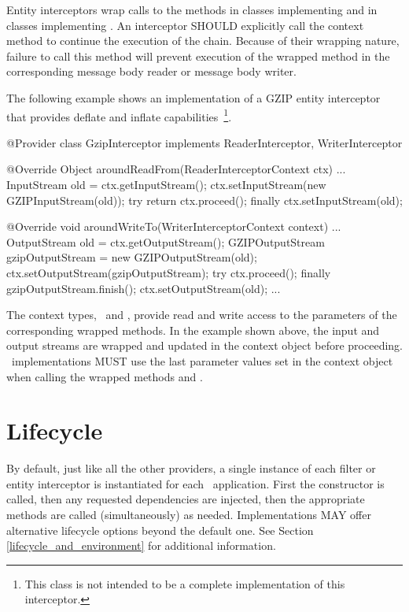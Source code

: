 Entity interceptors wrap calls to the methods  in classes implementing  and  in classes implementing . An interceptor SHOULD explicitly call the context method  to continue the execution of the chain. Because of their wrapping nature, failure to call this method will prevent execution of the wrapped method in the corresponding message body reader or message body writer.

The following example shows an implementation of a GZIP entity interceptor that provides deflate and inflate capabilities~\footnote{This class is not intended to be a complete implementation of this interceptor.}.

\begin{listing}{1}
@Provider
class GzipInterceptor implements ReaderInterceptor, WriterInterceptor {

    @Override
    Object aroundReadFrom(ReaderInterceptorContext ctx) ... {
        InputStream old = ctx.getInputStream();
        ctx.setInputStream(new GZIPInputStream(old));
        try {
            return ctx.proceed();
        } finally {
            ctx.setInputStream(old);
        }
    }

    @Override
    void aroundWriteTo(WriterInterceptorContext context) ... {
        OutputStream old = ctx.getOutputStream();
        GZIPOutputStream gzipOutputStream = new GZIPOutputStream(old);
        ctx.setOutputStream(gzipOutputStream);
        try {
            ctx.proceed();
        } finally {
            gzipOutputStream.finish();
            ctx.setOutputStream(old);
        }
    }
    ...
}
\end{listing}

The context types, \ReaderInterceptorContext\ and \WriterInterceptorContext, provide read and write access to the parameters of the corresponding wrapped methods. In the example shown above, the input and output streams are wrapped and updated in the context object before proceeding. \jaxrs\ implementations MUST use the last parameter values set in the context object when calling the wrapped methods  and .

\section{Lifecycle}

By default, just like all the other providers, a single instance of each filter or entity interceptor is instantiated for each \jaxrs\ application. First the constructor is called, then any requested dependencies are injected, then the appropriate methods are called (simultaneously) as needed. Implementations MAY offer alternative lifecycle options beyond the default one. See Section \ref{lifecycle_and_environment} for additional information.

